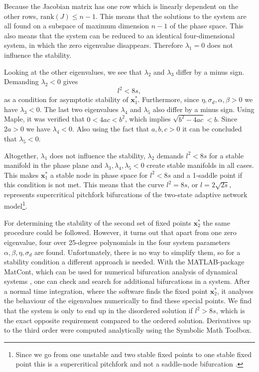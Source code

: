 Because the Jacobian matrix has one row which is linearly dependent on the other rows, $\text{rank}( J) \leq n-1$. This means that the solutions to the system are all found on a subspace of maximum dimension $n-1$ of the phase space. This also means that the system can be reduced to an identical four-dimensional system, in which the zero eigenvalue disappears. Therefore $\lambda_1=0$ does not influence the stability. 

Looking at the other eigenvalues, we see that $\lambda_2$ and $\lambda_3$ differ by a minus sign. Demanding $\lambda_2 < 0$ gives 
\begin{equation}
l^2<8s,
\end{equation}
as a condition for asymptotic stability of $\bm{x}_1^*$. Furthermore, since $\eta, \sigma_d, \alpha, \beta > 0$ we have $\lambda_3 < 0$. The last two eigenvalues $\lambda_4$ and $\lambda_5$ also differ by a minus sign. Using Maple, it was verified that $0 < 4ac < b^2$, which implies $\sqrt{b^2-4ac}  < b$. Since $2a > 0$ we have $\lambda_4 < 0$. Also using the fact that $a, b, c > 0$ it can be concluded that $ \lambda_5 < 0$.

Altogether, $\lambda_1$ does not influence the stability, $\lambda_2$ demands $l^2 < 8s$ for a stable manifold in the phase plane and $\lambda_3, \lambda_4, \lambda_5 < 0$ create stable manifolds in all cases. This makes $\bm{x}^*_1$ a stable node in phase space for $l^2 < 8s$ and a 1-saddle point if this condition is not met. This means that the curve $l^2 = 8s$, or $l = 2\sqrt{2s}$, represents supercritical pitchfork bifurcations of the two-state adaptive network model\footnote{Since we go from one unstable and two stable fixed points to one stable fixed point this is a supercritical pitchfork and not a saddle-node bifurcation \cite{Kuznetsov2004}.}. 

For determining the stability of the second set of fixed points $\bm{x}^*_2$ the same procedure could be followed. However, it turns out that apart from one zero eigenvalue, four over 25-degree polynomials in the four system parameters $\alpha, \beta, \eta, \sigma_d$ are found. Unfortunately, there is no way to simplify them, so for a stability condition a different approach is needed. With the MATLAB-package MatCont, which can be used for numerical bifurcation analysis of dynamical systems \cite{Dhooge2008}, one can check and search for additional bifurcations in a system. After a normal time integration, where the software finds the fixed point $\bm{x}_2^*$, it analyses the behaviour of the eigenvalues numerically to find these special points. We find that the system is only to end up in the disordered solution if $l^2>8s$, which is the exact opposite requirement compared to the ordered solution. Derivatives up to the third order were computed analytically using the Symbolic Math Toolbox.

